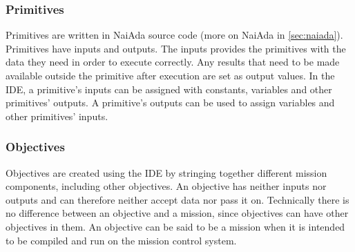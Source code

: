 \subsubsection{Primitives}
\label{sec:primitives}
Primitives are written in NaiAda source code (more on NaiAda in \cref{sec:naiada}). Primitives have inputs and outputs. The inputs provides the primitives with the data they need in order to execute correctly. Any results that need to be made available outside the primitive after execution are set as output values. In the IDE, a primitive's inputs can be assigned with constants, variables and other primitives' outputs. A primitive's outputs can be
used to assign variables and other primitives' inputs.

\subsubsection{Objectives}
Objectives are created using the IDE by stringing together different mission components, including other objectives. An objective has neither inputs nor outputs and can therefore neither accept data nor pass it on. Technically there is no difference between an objective and a mission, since objectives can have other objectives in them. An objective can be said to be a mission when it is intended to be compiled and run on the mission control system.
